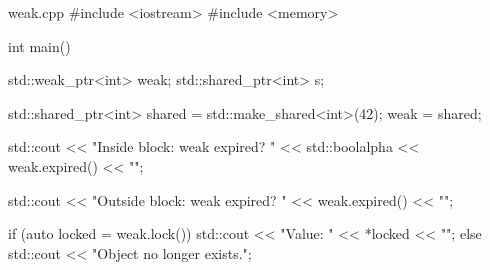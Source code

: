 \documentclass[12pt]{article}
\begin{document}
\begin{cxx}{weak.cpp}
#include <iostream>
#include <memory>

int main()
{
    std::weak_ptr<int> weak;
	std::shared_ptr<int> s;

    {
        std::shared_ptr<int> shared = std::make_shared<int>(42);
        weak = shared;

        std::cout << "Inside block: weak expired? " 
                  << std::boolalpha << weak.expired() << "\n";
    }

    std::cout << "Outside block: weak expired? " 
              << weak.expired() << "\n";

    if (auto locked = weak.lock())
	{
        std::cout << "Value: " << *locked << "\n";
    } else
	{
        std::cout << "Object no longer exists.\n";
    }
}
\end{cxx}
\end{document}
